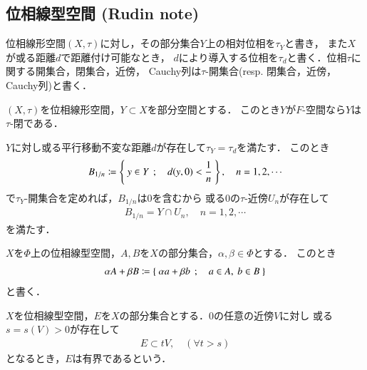 \subsection{位相線型空間 (Rudin note)}
	
	位相線形空間$(X,\tau)$に対し，その部分集合$Y$上の相対位相を$\tau_Y$と書き，
	また$X$が或る距離$d$で距離付け可能なとき，
	$d$により導入する位相を$\tau_d$と書く．位相$\tau$に関する開集合，閉集合，近傍，
	Cauchy列は$\tau$-開集合(resp. 閉集合，近傍，Cauchy列)と書く．
	
	\begin{screen}
		\begin{thm}
			$(X,\tau)$を位相線形空間，$Y \subset X$を部分空間とする．
			このとき$Y$が$F$-空間なら$Y$は$\tau$-閉である．
		\end{thm}
	\end{screen}
	
	\begin{prf}
		$Y$に対し或る平行移動不変な距離$d$が存在して$\tau_Y = \tau_d$を満たす．
		このとき
		\begin{align}
			B_{1/n} \coloneqq \left\{\ y \in Y\ \, ; \quad d(y,0) < \frac{1}{n}\ \right\},
			\quad n=1,2,\cdots
		\end{align}
		で$\tau_Y$-開集合を定めれば，$B_{1/n}$は$0$を含むから
		或る0の$\tau$-近傍$U_n$が存在して
		\begin{align}
			B_{1/n} = Y \cap U_n, \quad n=1,2,\cdots
		\end{align}
		を満たす．
	\end{prf}
	
	\begin{screen}
		\begin{dfn}[集合の線型演算]
			$X$を$\Phi$上の位相線型空間，$A,B$を$X$の部分集合，$\alpha,\beta \in \Phi$とする．
			このとき
			\begin{align}
				\alpha A + \beta B \coloneqq \left\{\ \alpha a + \beta b\ \, ; \quad a \in A,\ b \in B\ \right\}
			\end{align}
			と書く．
		\end{dfn}
	\end{screen}
	
	\begin{screen}
		\begin{dfn}[位相線形空間の有界集合]
			$X$を位相線型空間，$E$を$X$の部分集合とする．0の任意の近傍$V$に対し
			或る$s = s(V) > 0$が存在して
			\begin{align}
				E \subset t V, \quad (\forall t > s)
			\end{align}
			となるとき，$E$は有界であるという．
		\end{dfn}
	\end{screen}
	
